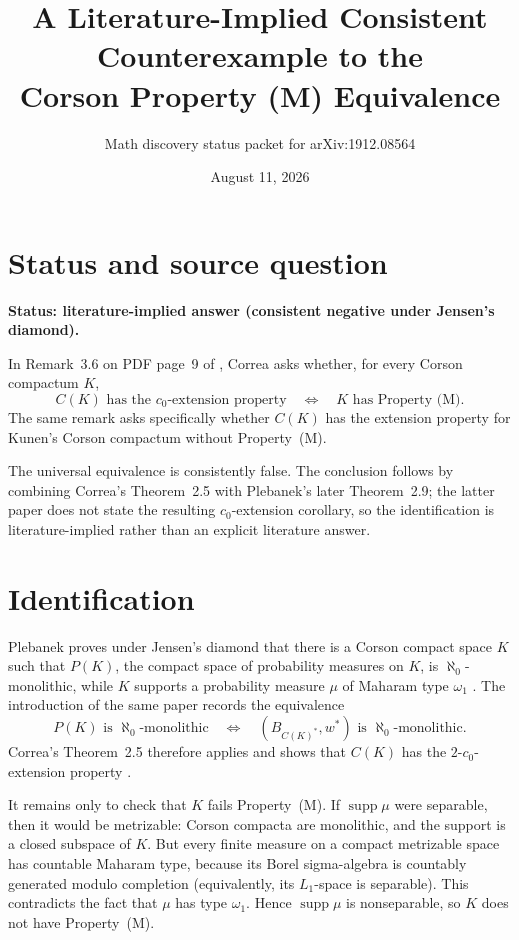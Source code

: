 \documentclass[11pt]{article}
\title{A Literature-Implied Consistent Counterexample to the\\
Corson Property (M) Equivalence}
\author{Math discovery status packet for arXiv:1912.08564}
\date{August 11, 2026}
\newcommand{\cEP}{\(c_0\)-extension property}
\begin{document}
\maketitle

\section*{Status and source question}

\textbf{Status: literature-implied answer (consistent negative under
Jensen's diamond).}

In Remark~3.6 on PDF page~9 of \cite{Correa}, Correa asks whether, for
every Corson compactum $K$,
\[
 C(K)\text{ has the }c_0\text{-extension property}
 \quad\Longleftrightarrow\quad
 K\text{ has Property (M)}.
\]
The same remark asks specifically whether $C(K)$ has the extension property
for Kunen's Corson compactum without Property~(M).

The universal equivalence is consistently false.  The conclusion follows by
combining Correa's Theorem~2.5 with Plebanek's later Theorem~2.9; the latter
paper does not state the resulting \(c_0\)-extension corollary, so the
identification is literature-implied rather than an explicit literature
answer.

\section*{Identification}

Plebanek proves under Jensen's diamond that there is a Corson compact space
$K$ such that $P(K)$, the compact space of probability measures on $K$,
is $\aleph_0$-monolithic, while $K$ supports a probability measure
$\mu$ of Maharam type $\omega_1$ \cite[Theorem~2.9, PDF p.~4]{Plebanek}.
The introduction of the same paper records the equivalence
\[
 P(K)\text{ is }\aleph_0\text{-monolithic}
 \quad\Longleftrightarrow\quad
 (B_{C(K)^*},w^*)\text{ is }\aleph_0\text{-monolithic}.
\]
Correa's Theorem~2.5 therefore applies and shows that $C(K)$ has the
$2$-\cEP{} \cite[Theorem~2.5, PDF p.~6]{Correa}.

It remains only to check that $K$ fails Property~(M).  If
$\operatorname{supp}\mu$ were separable, then it would be metrizable:
Corson compacta are monolithic, and the support is a closed subspace of
$K$.  But every finite measure on a compact metrizable space has countable
Maharam type, because its Borel sigma-algebra is countably generated modulo
completion (equivalently, its $L_1$-space is separable).  This contradicts
the fact that $\mu$ has type $\omega_1$.  Hence
$\operatorname{supp}\mu$ is nonseparable, so $K$ does not have
Property~(M).
\end{document}
